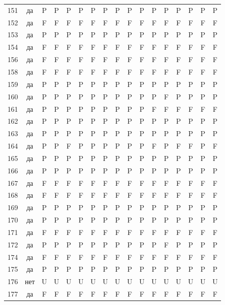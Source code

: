 \begin{table}[p]
\begin{tabular*}{\textwidth}{@{\extracolsep{\fill}}rcccccccccccccccc}
151 & да & P & P & P & P & P & P & P & P & P & P & P & P & P & P & P\\
152 & да & F & F & F & F & F & F & F & F & F & F & F & F & F & F & F\\
153 & да & P & P & P & P & P & P & P & P & P & P & P & P & P & P & P\\
154 & да & F & F & F & F & F & F & F & F & F & F & F & F & F & F & F\\
156 & да & F & F & F & F & F & F & F & F & F & F & F & F & F & F & F\\
158 & да & F & F & F & F & F & F & F & F & F & F & F & F & F & F & F\\
159 & да & P & P & P & P & P & P & P & P & P & P & P & P & P & P & P\\
160 & да & P & P & P & P & P & P & P & P & P & P & F & P & P & P & P\\
161 & да & P & P & P & P & P & P & P & P & P & F & F & F & F & F & F\\
162 & да & P & P & P & P & P & P & P & P & P & P & P & P & P & P & P\\
163 & да & P & P & P & P & P & P & P & P & P & P & P & P & P & P & P\\
164 & да & P & P & F & P & P & P & P & P & P & F & P & F & F & P & F\\
165 & да & P & P & P & P & P & P & P & P & P & P & P & P & P & P & P\\
166 & да & P & P & P & P & P & P & P & P & P & P & P & P & P & P & P\\
167 & да & F & F & F & F & F & F & F & F & F & F & F & F & F & F & F\\
168 & да & F & F & F & F & F & F & F & F & F & F & F & F & F & F & F\\
169 & да & P & P & P & P & P & P & P & P & P & P & P & P & P & P & P\\
170 & да & P & P & P & P & P & P & P & P & P & P & P & P & P & P & P\\
171 & да & F & F & F & F & F & F & F & F & F & F & F & F & F & F & F\\
172 & да & P & P & P & P & P & P & P & P & P & P & F & P & P & P & P\\
174 & да & F & F & F & F & F & F & F & F & F & F & F & F & F & F & F\\
175 & да & P & P & P & P & P & P & P & P & P & P & P & P & P & P & P\\
176 & нет & U & U & U & U & U & U & U & U & U & U & U & U & U & U & U\\
177 & да & F & F & F & F & F & F & F & F & F & F & F & F & F & F & F\\
\bottomrule\end{tabular*}\end{table}
\clearpage

